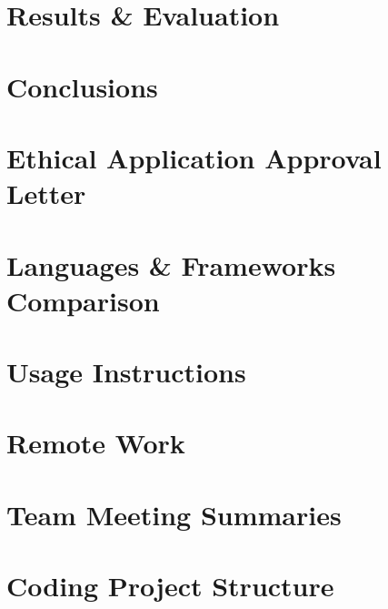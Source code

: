 \documentclass[11pt,oneside,a4paper]{report} %
\begin{document}
\chapter{Results \& Evaluation}
\label{ch:chapter-evaluation}


\chapter{Conclusions}
\label{ch:chapter-conclusions}




\appendix

\chapter{Ethical Application Approval Letter}
\label{ch:appendix-ethical-approval-letter}


\chapter{Languages \& Frameworks Comparison}


\chapter{Usage Instructions}
\label{ch:appendix-usage-instructions}


\chapter{Remote Work}
\label{ch:appendix-remote-work-environment}


\chapter{Team Meeting Summaries}
\label{ch:appendix-team-meeting-summaries}


\chapter{Coding Project Structure}
\label{ch:appendix-coding-project-structure}

\end{document}

